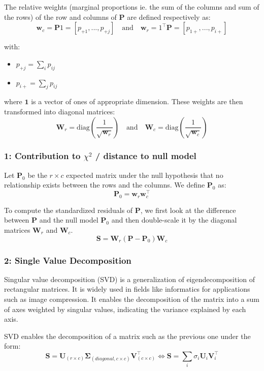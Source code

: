The relative weights (marginal proportions ie. the sum of the columns and sum of the rows) of the row and columns of $\mathbf{P}$ are defined respectively as: 
$$
    \mathbf{w}_c = \mathbf{P}1 = [p_{+1}, ... , p_{+j}] \quad \text{and} \quad \mathbf{w}_r = 1^\intercal\mathbf{P} = [p_{1+}, ... , p_{i+}]
$$

with:
\begin{itemize}
    \item $p_{+j} = \sum_ip_{ij}$
    \item $p_{i+} = \sum_jp_{ij}$
\end{itemize}

where \(\mathbf{1}\) is a vector of ones of appropriate dimension.
These weights are then transformed into diagonal matrices: 
$$
    \mathbf{W}_r = \text{diag}\left(\frac{1}{\sqrt{\mathbf{w}_r}}\right) \quad \text{and} \quad \mathbf{W}_c = \text{diag}\left(\frac{1}{\sqrt{\mathbf{w}_c}}\right)
$$

\subsubsection{1: Contribution to $\chi^2$ / distance to null model}

Let $\mathbf{P}_0$ be the $r\times c$ expected matrix under the null hypothesis that no relationship exists between the rows and the columns. We define $\mathbf{P}_0$ as:
$$
    \mathbf{P}_0 = \mathbf{w}_r \mathbf{w}_c^\intercal
$$

To compute the standardized residuals of $\mathbf{P}$, we first look at the difference between $\mathbf{P}$ and the null model $\mathbf{P}_0$ and then double-scale it by the diagonal matrices $\mathbf{W}_r$ and $\mathbf{W}_c$. 
$$
    \mathbf{S} = \mathbf{W}_r (\mathbf{P} - \mathbf{P}_0) \mathbf{W}_c
$$

\subsubsection{2: Single Value Decomposition}

Singular value decomposition (SVD) is a generalization of eigendecomposition of rectangular matrices. It is widely used in fields like informatics for applications such as image compression. It enables the decomposition of the matrix into a sum of axes weighted by singular values, indicating the variance explained by each axis.

SVD enables the decomposition of a matrix such as the previous one under the form: 
$$
    \mathbf{S} = \mathbf{U}_{(r\times c)} \mathbf{\Sigma}_{(diagonal, c\times c)} \mathbf{V}_{(c \times c)}^\intercal \Leftrightarrow \mathbf{S} = \sum_i \sigma_i \mathbf{U}_i \mathbf{V}_i^\intercal
$$

